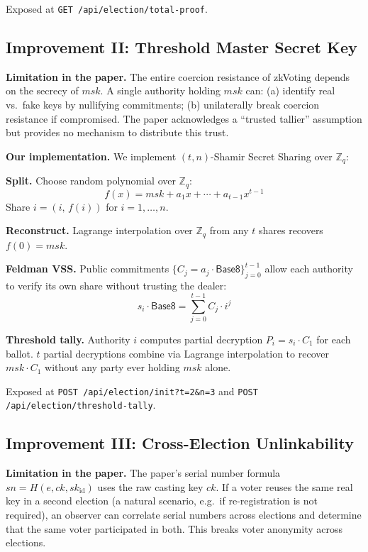 \documentclass[conference]{IEEEtran}
\begin{document}
Exposed at \texttt{GET /api/election/total-proof}.

\subsection{Improvement II: Threshold Master Secret Key}

\textbf{Limitation in the paper.}
The entire coercion resistance of zkVoting depends on the secrecy of $\mathit{msk}$.
A single authority holding $\mathit{msk}$ can:
(a) identify real vs.\ fake keys by nullifying commitments;
(b) unilaterally break coercion resistance if compromised.
The paper acknowledges a ``trusted tallier'' assumption but provides no
mechanism to distribute this trust.

\textbf{Our implementation.}
We implement $(t,n)$-Shamir Secret Sharing \cite{shamir1979share} over
$\mathbb{Z}_q$:

\vspace{4pt}
\noindent\textbf{Split.}
Choose random polynomial over $\mathbb{Z}_q$:
\[
  f(x) = \mathit{msk} + a_1 x + \cdots + a_{t-1}x^{t-1}
\]
Share $i = (i,\, f(i))$ for $i = 1,\ldots,n$.

\vspace{4pt}
\noindent\textbf{Reconstruct.}
Lagrange interpolation over $\mathbb{Z}_q$ from any $t$ shares recovers
$f(0) = \mathit{msk}$.

\vspace{4pt}
\noindent\textbf{Feldman VSS.}
Public commitments $\{C_j = a_j\cdot\mathsf{Base8}\}_{j=0}^{t-1}$
allow each authority to verify its own share without trusting the dealer:
\[
  s_i\cdot\mathsf{Base8} = \textstyle\sum_{j=0}^{t-1} C_j\cdot i^j
\]

\vspace{4pt}
\noindent\textbf{Threshold tally.}
Authority $i$ computes partial decryption $P_i = s_i\cdot C_1$ for each ballot.
$t$ partial decryptions combine via Lagrange interpolation to recover
$\mathit{msk}\cdot C_1$ without any party ever holding $\mathit{msk}$ alone.

Exposed at \texttt{POST /api/election/init?t=2\&n=3} and
\texttt{POST /api/election/threshold-tally}.

\subsection{Improvement III: Cross-Election Unlinkability}

\textbf{Limitation in the paper.}
The paper's serial number formula $\mathit{sn} = H(e, \mathit{ck},
\mathit{sk}_{\mathrm{id}})$ uses the raw casting key $\mathit{ck}$.  If a voter
reuses the same real key in a second election (a natural scenario, e.g.\ if
re-registration is not required), an observer can correlate serial numbers
across elections and determine that the same voter participated in both.
This breaks voter anonymity across elections.
\end{document}
